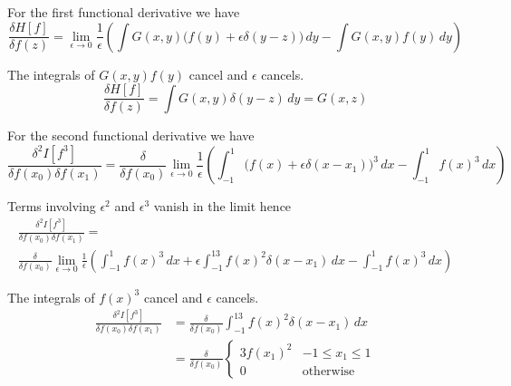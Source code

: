 


\bigskip
For the first functional derivative we have
\begin{equation*}
\frac{\delta H[f]}{\delta f(z)}
=\lim_{\epsilon\rightarrow0}\frac{1}{\epsilon}
\left(
\int G(x,y)\big(f(y)+\epsilon\delta(y-z)\big)\,dy
-\int G(x,y)f(y)\,dy
\right)
\end{equation*}

The integrals of $G(x,y)f(y)$ cancel and $\epsilon$ cancels.
\begin{equation*}
\frac{\delta H[f]}{\delta f(z)}=\int G(x,y)\delta(y-z)\,dy=G(x,z)
\end{equation*}

For the second functional derivative we have
\begin{equation*}
\frac{\delta^2 I[f^3]}{\delta f(x_0)\delta f(x_1)}
=\frac{\delta}{\delta f(x_0)}
\lim_{\epsilon\rightarrow0}\frac{1}{\epsilon}
\left(
\int_{-1}^{1}\big(f(x)+\epsilon\delta(x-x_1)\big)^3\,dx
-\int_{-1}^{1}f(x)^3\,dx
\right)
\end{equation*}

Terms involving $\epsilon^2$ and $\epsilon^3$ vanish in the limit hence
\begin{multline*}
\frac{\delta^2 I[f^3]}{\delta f(x_0)\delta f(x_1)}={}
\\
\frac{\delta}{\delta f(x_0)}
\lim_{\epsilon\rightarrow0}\frac{1}{\epsilon}
\left(
\int_{-1}^1f(x)^3\,dx+\epsilon\int_{-1}^13f(x)^2\delta(x-x_1)\,dx-\int_{-1}^{1}f(x)^3\,dx
\right)
\end{multline*}

The integrals of $f(x)^3$ cancel and $\epsilon$ cancels.
\begin{align*}
\frac{\delta^2 I[f^3]}{\delta f(x_0)\delta f(x_1)}
&=\frac{\delta}{\delta f(x_0)}\int_{-1}^13f(x)^2\delta(x-x_1)\,dx
\\
&=\frac{\delta}{\delta f(x_0)}
\begin{cases}
3f(x_1)^2 & -1\le x_1\le 1
\\
0 & \text{otherwise}
\end{cases}
\tag{1}
\end{align*}

